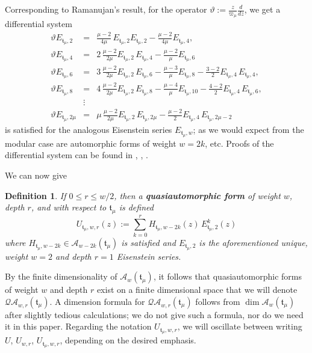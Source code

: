 \documentclass[11pt]{article}
\newtheorem{defin}{Definition}
\begin{document}
Corresponding to Ramanujan's result, for the operator $ \vartheta := \frac{z}{\varpi_\mu}\frac{d}{dz} $, we get a differential system 
    \begin{eqnarray*}
        \vartheta E_{\mathfrak{t}_\mu, 2} &=& \frac{\mu-2}{4\mu}\, E_{\mathfrak{t}_\mu,2}E_{\mathfrak{t}_\mu, 2}  - \frac{\mu-2}{4\mu}E_{\mathfrak{t}_\mu,4}, \\
        \vartheta E_{\mathfrak{t}_\mu, 4} &=& 2\,\frac{\mu-2}{2\mu}E_{\mathfrak{t}_\mu,2}\, E_{\mathfrak{t}_\mu,4} - \frac{\mu-2}{\mu}E_{\mathfrak{t}_\mu,6} \\
        \vartheta E_{\mathfrak{t}_\mu,6} &=& 3\,\frac{\mu-2}{2\mu}E_{\mathfrak{t}_\mu,2}\, E_{\mathfrak{t}_\mu,6} -\frac{\mu-3}{\mu}E_{\mathfrak{t}_\mu,8} - \frac{3-2}{2}E_{\mathfrak{t}_\mu,4}\,E_{\mathfrak{t}_\mu,4} , \\
        \vartheta E_{\mathfrak{t}_\mu,8} &=& 4\,\frac{\mu-2}{2\mu}E_{\mathfrak{t}_\mu,2}\, E_{\mathfrak{t}_\mu,8} -\frac{\mu-4}{\mu}E_{\mathfrak{t}_\mu,10} - \frac{4 - 2}{2}E_{\mathfrak{t}_\mu,4}\, E_{\mathfrak{t}_\mu,6}, \\
        & \vdots & \\
        \vartheta E_{\mathfrak{t}_\mu, 2 \mu} &=& \mu\, \frac{\mu-2}{2\mu}E_{\mathfrak{t}_\mu,2} \,E_{\mathfrak{t}_\mu, 2\mu}-\frac{\mu - 2}{2}E_{\mathfrak{t}_\mu,4} \, E_{\mathfrak{t}_\mu, 2\mu-2}  
    \end{eqnarray*}
is satisfied for the analogous Eisenstein series $ E_{\mathfrak{t}_\mu, w} $; as we would expect from the modular case are automorphic forms of weight $ w = 2k$, etc. Proofs of the differential system can be found in  \cite{ashokEtAl2020I}, \cite{doranEtAl2013}, \cite{henry2025}. 

We can now give 
    \begin{defin}
        If $ 0 \leq r \leq w/2 $, then a \textbf{quasiautomorphic form} of weight $ w $, depth $ r $, and with respect to $\mathfrak{t}_\mu$  is defined
            \begin{equation}\label{eq:standarForm}
                U_{\mathfrak{t}_\mu, w,r}(z) :=  \sum_{k=0}^{r} H_{\mathfrak{t}_\mu, w-2k}(z)\, E^k_{\mathfrak{t}_\mu, 2 } (z) 
            \end{equation}
        where $ H_{\mathfrak{t}_\mu, w-2k} \in \mathcal{A}_{w-2k}(\mathfrak{t}_\mu) $ is satisfied and $ E_{\mathfrak{t}_\mu, 2} $ is the aforementioned unique, weight $w =2 $ and depth $r=1$ Eisenstein series.
    \end{defin}
By the finite dimensionality of $\mathcal{A}_w(\mathfrak{t}_\mu) $, it follows that quasiautomorphic forms of weight $ w $ and depth $ r $ exist on a finite dimensional space that we will denote $ \mathcal{QA}_{w,r}(\mathfrak{t}_\mu) $. A dimension formula for $\mathcal{QA}_{w,r}(\mathfrak{t}_\mu) $ follows from $ \dim \mathcal{A}_{w}(\mathfrak{t}_\mu) $ after slightly tedious calculations; we do not give such a formula, nor do we need it in this paper. Regarding the notation $ U_{\mathfrak{t}_\mu, w, r} $, we will oscillate between writing $ U $, $ U_{ w, r} $, $U_{\mathfrak{t}_\mu, w, r} $, depending on the desired emphasis.  
\end{document}
